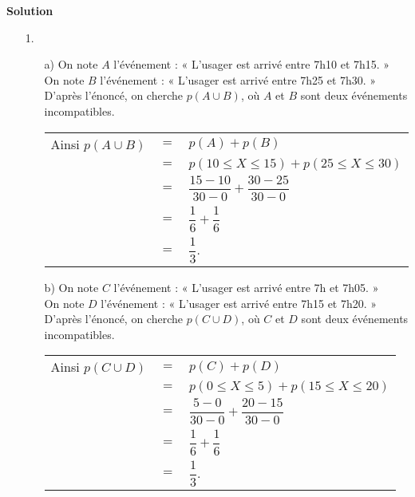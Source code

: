 \vspace*{.3cm}

\textbf{Solution} \\

\begin{itemize}
\item[1.]
\begin{itemize}
\item[a)] On note $A$ l'événement : « L'usager est arrivé entre 7h10 et 7h15. » \\
On note $B$ l'événement : « L'usager est arrivé entre 7h25 et 7h30. » \\

D'après l'énoncé, on cherche $p\left(A \cup B\right)$, où $A$ et $B$ sont deux événements incompatibles. \\

\begin{tabular}{lll}
\hspace*{-.3cm} Ainsi $p\left(A \cup B\right)$ & $=$ & $p\left(A\right) + p\left(B\right)$ \vspace*{.3cm} \\
& $=$ & $p\left(10 \leqslant X \leqslant 15\right) + p\left(25 \leqslant X \leqslant 30\right)$ \vspace*{.3cm} \\
& $=$ & $\dfrac{15 - 10}{30 - 0} + \dfrac{30 - 25}{30 - 0}$ \vspace*{.3cm} \\
& $=$ & $\dfrac{1}{6} + \dfrac{1}{6}$ \vspace*{.3cm} \\
& $=$ & $\dfrac{1}{3}$. \\
\end{tabular}

\vspace*{.3cm} 

\item[b)] On note $C$ l'événement : « L'usager est arrivé entre 7h et 7h05. » \\
On note $D$ l'événement : « L'usager est arrivé entre 7h15 et 7h20. » \\

D'après l'énoncé, on cherche $p\left(C \cup D\right)$, où $C$ et $D$ sont deux événements incompatibles. \\

\begin{tabular}{lll}
\hspace*{-.3cm} Ainsi $p\left(C \cup D\right)$ & $=$ & $p\left(C\right) + p\left(D\right)$ \vspace*{.3cm} \\
& $=$ & $p\left(0 \leqslant X \leqslant 5\right) + p\left(15 \leqslant X \leqslant 20\right)$ \vspace*{.3cm} \\
& $=$ & $\dfrac{5 - 0}{30 - 0} + \dfrac{20 - 15}{30 - 0}$ \vspace*{.3cm} \\
& $=$ & $\dfrac{1}{6} + \dfrac{1}{6}$ \vspace*{.3cm} \\
& $=$ & $\dfrac{1}{3}$. 
\end{tabular}


\end{itemize}
\end{itemize}
